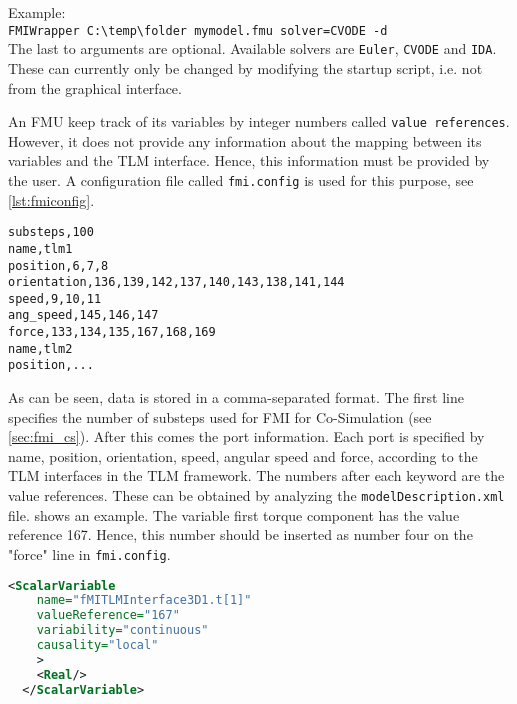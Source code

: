 \documentclass[11pt,a4paper]{report}
\begin{document}
Example:\\

\noindent \verb|FMIWrapper C:\temp\folder mymodel.fmu solver=CVODE -d|\\

The last to arguments are optional.
Available solvers are \texttt{Euler}, \texttt{CVODE} and \texttt{IDA}.
These can currently only be changed by modifying the startup script, i.e. not from the graphical interface.

An FMU keep track of its variables by integer numbers called \texttt{value references}.
However, it does not provide any information about the mapping between its variables and the TLM interface.
Hence, this information must be provided by the user.
A configuration file called \texttt{fmi.config} is used for this purpose, see \cref{lst:fmiconfig}.

\begin{lstlisting}[basicstyle=\ttfamily,floatplacement=ht,caption="Blabla",label=lst:fmiconfig]
substeps,100
name,tlm1
position,6,7,8
orientation,136,139,142,137,140,143,138,141,144
speed,9,10,11
ang_speed,145,146,147
force,133,134,135,167,168,169
name,tlm2
position,...
\end{lstlisting}

As can be seen, data is stored in a comma-separated format.
The first line specifies the number of substeps used for FMI for Co-Simulation (see \cref{sec:fmi_cs}).
After this comes the port information.
Each port is specified by name, position, orientation, speed, angular speed and force, according to the TLM interfaces in the TLM framework.
The numbers after each keyword are the value references.
These can be obtained by analyzing the \texttt{modelDescription.xml} file.
 shows an example.
The variable first torque component has the value reference 167.
Hence, this number should be inserted as number four on the "force" line in \texttt{fmi.config}.

\begin{lstlisting}[language=XML,floatplacement=ht,caption="Blabla",label=lst:modeldescription]
  <ScalarVariable
    name="fMITLMInterface3D1.t[1]"
    valueReference="167"
    variability="continuous"
    causality="local"
    >
    <Real/>
  </ScalarVariable>
\end{lstlisting}



\FloatBarrier
\end{document}
